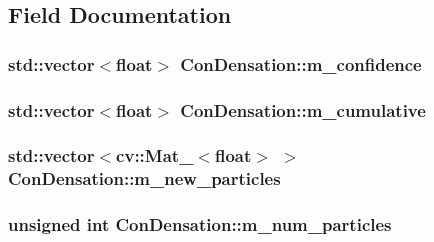 \subsection{Field Documentation}
\hypertarget{classConDensation_abc5be0956acb4bd5c6383c4e095aac86}{
\subsubsection[{m\-\_\-confidence}]{\setlength{\rightskip}{0pt plus 5cm}std\-::vector$<$float$>$ Con\-Densation\-::m\-\_\-confidence\hspace{0.3cm}{\ttfamily [protected]}}}\label{classConDensation_abc5be0956acb4bd5c6383c4e095aac86}
\hypertarget{classConDensation_a9062fce705b93a2ab93c114aa579943a}{
\subsubsection[{m\-\_\-cumulative}]{\setlength{\rightskip}{0pt plus 5cm}std\-::vector$<$float$>$ Con\-Densation\-::m\-\_\-cumulative\hspace{0.3cm}{\ttfamily [protected]}}}\label{classConDensation_a9062fce705b93a2ab93c114aa579943a}
\hypertarget{classConDensation_a489443034896778939e5e24741d42728}{
\subsubsection[{m\-\_\-new\-\_\-particles}]{\setlength{\rightskip}{0pt plus 5cm}std\-::vector$<$cv\-::\-Mat\-\_\-$<$float$>$ $>$ Con\-Densation\-::m\-\_\-new\-\_\-particles\hspace{0.3cm}{\ttfamily [protected]}}}\label{classConDensation_a489443034896778939e5e24741d42728}
\hypertarget{classConDensation_a6dd623ea8aa0fda252df3676dec562be}{
\subsubsection[{m\-\_\-num\-\_\-particles}]{\setlength{\rightskip}{0pt plus 5cm}unsigned int Con\-Densation\-::m\-\_\-num\-\_\-particles\hspace{0.3cm}{\ttfamily [protected]}}}\label{classConDensation_a6dd623ea8aa0fda252df3676dec562be}
